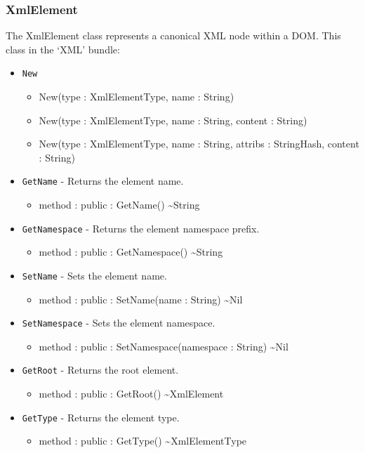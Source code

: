\documentclass[11pt]{article}
\begin{document}
\subsubsection{XmlElement}
The XmlElement class represents a canonical XML node within a
DOM. This class in the `XML' bundle:
\begin{itemize}
\item \texttt{New}
  \begin{itemize}
  \item New(type : XmlElementType, name : String)
  \item New(type : XmlElementType, name : String, content : String)
  \item New(type : XmlElementType, name : String, attribs :
    StringHash, content : String)
  \end{itemize}
\item \texttt{GetName} - Returns the element name.
  \begin{itemize}
  \item method : public : GetName() \textasciitilde String
  \end{itemize}
\item \texttt{GetNamespace} - Returns the element namespace prefix.
  \begin{itemize}
  \item method : public : GetNamespace() \textasciitilde String
  \end{itemize}
\item \texttt{SetName} - Sets the element name.
  \begin{itemize}
  \item method : public : SetName(name : String) \textasciitilde Nil
  \end{itemize}
\item \texttt{SetNamespace} - Sets the element namespace.
  \begin{itemize}
  \item method : public : SetNamespace(namespace : String) \textasciitilde Nil
  \end{itemize}
\item \texttt{GetRoot} - Returns the root element.
  \begin{itemize}
  \item method : public : GetRoot() \textasciitilde XmlElement
  \end{itemize}
\item \texttt{GetType} - Returns the element type.
  \begin{itemize}
  \item method : public : GetType() \textasciitilde XmlElementType

\end{itemize}
\end{itemize}
\end{document}
